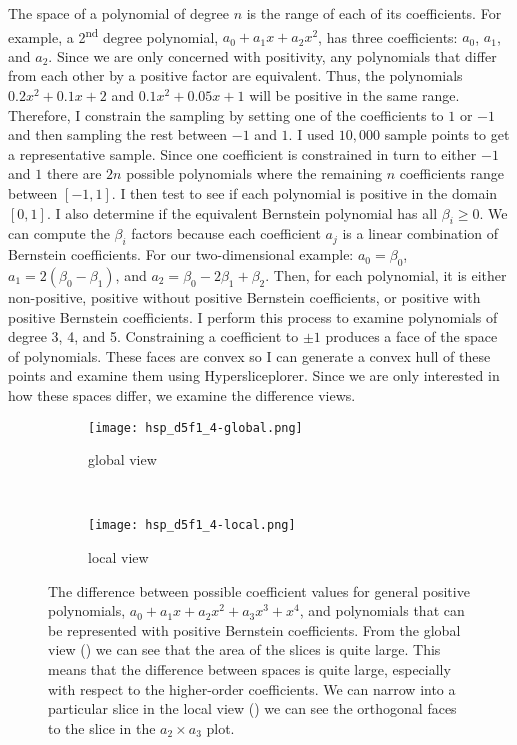 The space of a polynomial of degree \(n\) is the range of each of its
coefficients. For example, a 2\textsuperscript{nd} degree polynomial, \(a_0 +
a_1 x + a_2 x^2\), has three coefficients: \(a_0\), \(a_1\), and \(a_2\).
Since we are only concerned with positivity, any polynomials that differ from
each other by a positive factor are equivalent. Thus, the polynomials $0.2x^2 +
0.1x + 2$ and $0.1x^2 + 0.05x + 1$ will be positive in the same range.
Therefore, I constrain the sampling by setting one of the coefficients to $1$
or $-1$ and then sampling the rest between $-1$ and $1$.  I used $10,000$
sample points to get a representative sample.  Since one coefficient is
constrained in turn to either \(-1\) and \(1\) there are \(2n\) possible
polynomials where the remaining \(n\) coefficients range between \([-1,1]\). I
then test to see if each polynomial is positive in the domain \([0,1]\). I also
determine if the equivalent Bernstein polynomial has all \(\beta_i \ge 0\). We
can compute the \(\beta_i\) factors because each coefficient \(a_j\) is a
linear combination of Bernstein coefficients. For our two-dimensional example:
\(a_0 = \beta_0\), \(a_1 = 2(\beta_0-\beta_1)\), and \(a_2=\beta_0 - 2\beta_1 +
\beta_2\). Then, for each polynomial, it is either non-positive, positive
without positive Bernstein coefficients, or positive with positive Bernstein
coefficients. I perform this process to examine polynomials of degree 3, 4, and
5. Constraining a coefficient to $\pm 1$ produces a face of the space of
polynomials. These faces are convex so I can generate a convex hull of these
points and examine them using Hypersliceplorer. Since we are only interested in
how these spaces differ, we examine the difference views.

\begin{figure}
  \centering
  \begin{subfigure}[b]{0.45\linewidth}
    \texttt{[image: hsp\_d5f1\_4-global.png]}
    \caption{global view}
    \label{fig:spacediff:global}
  \end{subfigure}
  ~
  \begin{subfigure}[b]{0.45\linewidth}
    \texttt{[image: hsp\_d5f1\_4-local.png]}
    \caption{local view}
    \label{fig:spacediff:local}
  \end{subfigure}
  \caption[Using Hypersliceplorer to examine differences in spaces]{%
    The difference between possible coefficient values for general positive 
    polynomials, $a_0 + a_1 x + a_2 x^2 + a_3 x^3 + x^4$, and polynomials
    that can be represented with positive Bernstein coefficients. From the 
    global view () we can see that the 
    area of the slices is quite large. This means that the 
    difference between spaces is quite large, especially with respect to the
    higher-order coefficients. We can narrow into a particular slice in
    the local view () we can see 
    the orthogonal faces to the slice in the $a_2 \times a_3$ plot.
  }
  \label{fig:spacediff}
\end{figure}

